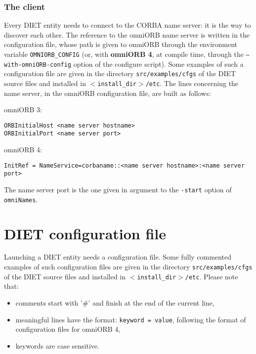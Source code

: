 \subsubsection{The client}

Every DIET entity needs to connect to the CORBA name server: it is the way to
discover each other. The reference to the omniORB name server is written in the
configuration file, whose path is given to omniORB through the environment
variable \texttt{OMNIORB\_CONFIG} (or, with \textbf{omniORB 4}, at compile time,
through the \texttt{--with-omniORB-config} option of the configure script). Some
examples of such a configuration file are given in the directory
\texttt{src/examples/cfgs} of the DIET source files and installed in
\texttt{$<$install\_dir$>$/etc}. The lines concerning the name server, in the
omniORB configuration file, are built as follows:
\begin{description}
 \item{omniORB 3:}
{\footnotesize
\begin{verbatim}
ORBInitialHost <name server hostname>
ORBInitialPort <name server port>
\end{verbatim}
}
 \item{omniORB 4:}
{\footnotesize
\begin{verbatim}
InitRef = NameService=corbaname::<name server hostname>:<name server port>
\end{verbatim}
}
The name server port is the one given in argument to the \texttt{-start} option
of \texttt{omniNames}.
\end{description}



\section{DIET configuration file} 

Launching a DIET entity needs a configuration file. Some fully commented
examples of such configuration files are given in the directory
\texttt{src/examples/cfgs} of the DIET source files and installed in
\texttt{$<$install\_dir$>$/etc}. Please note that:
\begin{itemize}
\item comments start with '\#' and finish at the end of the current
  line,
\item meaningful lines have the format: \texttt{keyword = value}, following the
  format of configuration files for omniORB 4,
\item keywords are case sensitive.
\end{itemize}

